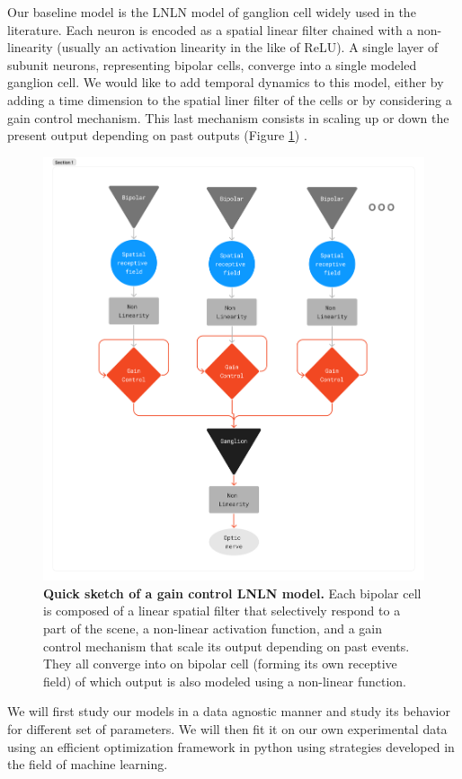 Our baseline model is the LNLN model of ganglion cell widely used in the literature. Each neuron is encoded as a spatial linear filter chained with a non-linearity (usually an activation linearity in the like of ReLU). A single layer of subunit neurons, representing bipolar cells, converge into a single modeled ganglion cell.  We would like to add temporal dynamics to this model, either by adding a time dimension to the spatial liner filter of the cells or by considering a gain control mechanism. This last mechanism consists in scaling up or down the present output depending on past outputs (Figure \ref{fig:LNLN}) \citep{chen_alert_2013}. 

\begin{figure}
    \centering
    \includegraphics[scale = 0.3]{images/GCModelDiagram.png}
    \caption{\textbf{Quick sketch of a gain control LNLN model.} Each bipolar cell is composed of a linear spatial filter that selectively respond to a part of the scene, a non-linear activation function, and a gain control mechanism that scale its output depending on past events. They all converge into on bipolar cell (forming its own receptive field) of which output is also modeled using a non-linear function.}
    \label{fig:LNLN}
\end{figure}
We will first study our models in a data agnostic manner and study its behavior for different set of parameters. We will then fit it on our own experimental data using an efficient optimization framework in python using strategies developed in the field of machine learning.

